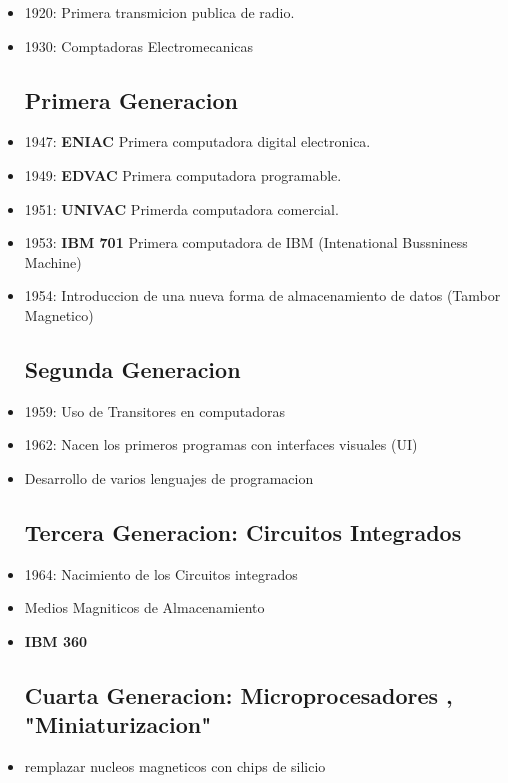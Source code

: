 \documentclass[11pt]{article}
\begin{document}
\begin{multicols}{2}
\begin{itemize}
  \begin{itemize}
      
    \item 1920:  Primera transmicion publica de radio.
      
    \item 1930:  Comptadoras Electromecanicas
      
    \subsection{Primera Generacion}
    \item 1947: \textbf{ENIAC} Primera computadora digital electronica.
    \item 1949: \textbf{EDVAC} Primera computadora programable.
    \item 1951: \textbf{UNIVAC} Primerda computadora comercial. 
    \item 1953: \textbf{IBM 701} Primera computadora de IBM  (Intenational Bussniness Machine)
    \item 1954: Introduccion de una nueva forma de almacenamiento de datos (Tambor Magnetico)
    \subsection{Segunda Generacion}
    \item 1959: Uso de Transitores en computadoras 
    \item 1962: Nacen los primeros programas con interfaces visuales (UI)  
    \item Desarrollo de varios lenguajes de programacion 
    \subsection{Tercera Generacion: Circuitos Integrados}
    
    \item 1964: Nacimiento de los Circuitos integrados

    \item Medios Magniticos de Almacenamiento 
    \item \textbf{IBM 360}
    
    \subsection{Cuarta Generacion: Microprocesadores , "Miniaturizacion"}
    
    \item remplazar nucleos magneticos con chips de silicio
    

\end{itemize}
\end{itemize}
\end{multicols}
\end{document}
